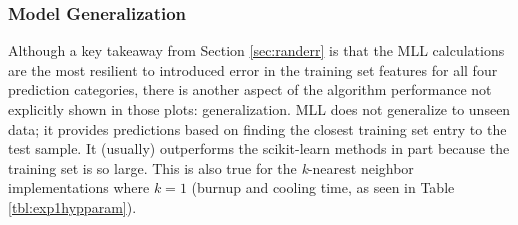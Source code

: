 
\subsubsection{Model Generalization}
\label{sec:randerrC}


Although a key takeaway from Section \ref{sec:randerr} is that the \gls{MLL}
calculations are the most resilient to introduced error in the training set
features for all four prediction categories, there is another aspect of the
algorithm performance not explicitly shown in those plots: generalization.
\Gls{MLL} does not generalize to unseen data; it provides predictions based on
finding the closest training set entry to the test sample.  It (usually)
outperforms the scikit-learn methods in part because the training set is so
large. This is also true for the \textit{k}-nearest neighbor implementations
where $k=1$ (burnup and cooling time, as seen in Table \ref{tbl:exp1hypparam}).


